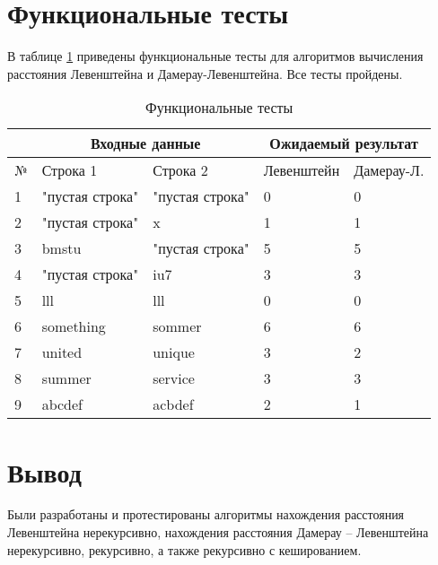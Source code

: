 \section{Функциональные тесты}
В таблице \ref{tabular:functional_test} приведены функциональные тесты для алгоритмов вычисления расстояния Левенштейна и Дамерау-Левенштейна. Все тесты пройдены.

\begin{table}[h]
    \begin{center}
    \begin{threeparttable}
    \captionsetup{justification=raggedright,singlelinecheck=off}	\caption{\label{tabular:functional_test} Функциональные тесты}
		\begin{tabular}{|l|l|l|l|l|}
			\hline
			&  \multicolumn{2}{c|}{Входные данные}& \multicolumn{2}{c|}{Ожидаемый результат} \\
			\hline
			№&Строка 1&Строка 2&Левенштейн&Дамерау-Л. \\
			\hline
			1&"пустая строка"&"пустая строка"&0&0 \\
			\hline
			2&"пустая строка"&x&1&1 \\
			\hline
			3&bmstu&"пустая строка"&5&5 \\
			\hline
			4&"пустая строка"&iu7&3&3 \\
			\hline
			5&lll&lll&0&0 \\
			\hline
			6&something&sommer&6&6 \\
			\hline
			7&united&unique&3&2 \\
			\hline
			8&summer&service&3&3 \\
			\hline
            9&abcdef&acbdef&2&1\\
            \hline
		\end{tabular}
	\end{threeparttable}
	\end{center}
\end{table}

\section*{Вывод}

Были разработаны и протестированы алгоритмы нахождения расстояния Левенштейна нерекурсивно, нахождения расстояния Дамерау -- Левенштейна нерекурсивно, рекурсивно, а также рекурсивно с кешированием.
